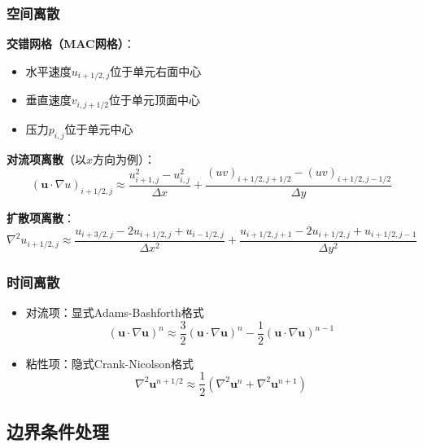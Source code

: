 \documentclass[UTF8]{ctexart}
\begin{document}
\subsubsection{空间离散}
\textbf{交错网格（MAC网格）}：
\begin{itemize}
    \item 水平速度$u_{i+1/2,j}$位于单元右面中心
    \item 垂直速度$v_{i,j+1/2}$位于单元顶面中心
    \item 压力$p_{i,j}$位于单元中心
\end{itemize}

\textbf{对流项离散}（以$x$方向为例）：
\begin{equation}
(\mathbf{u} \cdot \nabla u)_{i+1/2,j} \approx \frac{u_{i+1,j}^2 - u_{i,j}^2}{\Delta x} + \frac{(uv)_{i+1/2,j+1/2} - (uv)_{i+1/2,j-1/2}}{\Delta y}
\label{eq:convection}
\end{equation}

\textbf{扩散项离散}：
\begin{equation}
\nabla^2 u_{i+1/2,j} \approx \frac{u_{i+3/2,j} - 2u_{i+1/2,j} + u_{i-1/2,j}}{\Delta x^2} + \frac{u_{i+1/2,j+1} - 2u_{i+1/2,j} + u_{i+1/2,j-1}}{\Delta y^2}
\label{eq:diffusion}
\end{equation}

\subsubsection{时间离散}
\begin{itemize}
    \item 对流项：显式Adams-Bashforth格式
    \begin{equation}
    (\mathbf{u} \cdot \nabla \mathbf{u})^{n} \approx \frac{3}{2}(\mathbf{u} \cdot \nabla \mathbf{u})^{n} - \frac{1}{2}(\mathbf{u} \cdot \nabla \mathbf{u})^{n-1}
    \label{eq:adams}
    \end{equation}
    
    \item 粘性项：隐式Crank-Nicolson格式
    \begin{equation}
    \nabla^2 \mathbf{u}^{n+1/2} \approx \frac{1}{2} \left( \nabla^2 \mathbf{u}^n + \nabla^2 \mathbf{u}^{n+1} \right)
    \label{eq:crank}
    \end{equation}
\end{itemize}

\subsection{边界条件处理}
\end{document}
